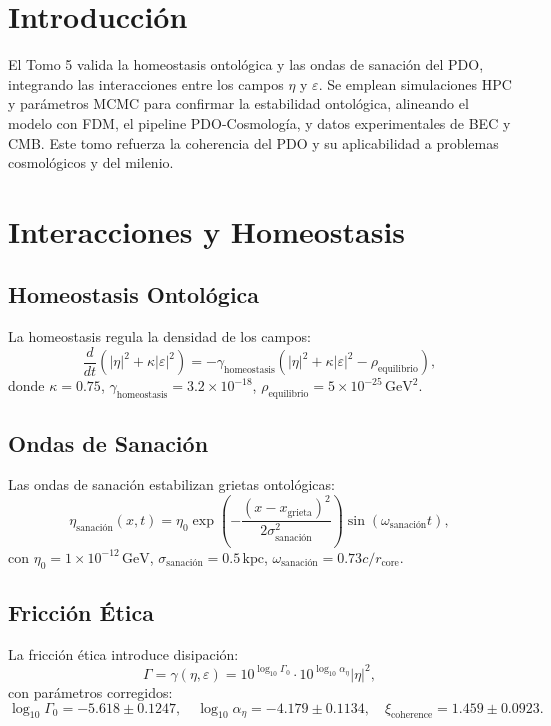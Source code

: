 \documentclass[a4paper,12pt]{article}
\newcommand{\eps}{\varepsilon}
\newcommand{\etaa}{\eta}
\newcommand{\gev}{\text{GeV}}
\newcommand{\rcore}{r_{\text{core}}}
\begin{document}
\tableofcontents
\newpage

\section{Introducción}
El Tomo 5 valida la homeostasis ontológica y las ondas de sanación del PDO, integrando las interacciones entre los campos \(\etaa\) y \(\eps\). Se emplean simulaciones HPC y parámetros MCMC para confirmar la estabilidad ontológica, alineando el modelo con FDM, el pipeline PDO-Cosmología, y datos experimentales de BEC y CMB. Este tomo refuerza la coherencia del PDO y su aplicabilidad a problemas cosmológicos y del milenio.

\section{Interacciones y Homeostasis}
\subsection{Homeostasis Ontológica}
La homeostasis regula la densidad de los campos:
\[
\frac{d}{dt}(|\etaa|^2 + \kappa |\eps|^2) = -\gamma_{\text{homeostasis}} (|\etaa|^2 + \kappa |\eps|^2 - \rho_{\text{equilibrio}}),
\]
donde \(\kappa = 0.75\), \(\gamma_{\text{homeostasis}} = 3.2 \times 10^{-18}\), \(\rho_{\text{equilibrio}} = 5 \times 10^{-25} \, \gev^2\).

\subsection{Ondas de Sanación}
Las ondas de sanación estabilizan grietas ontológicas:
\[
\etaa_{\text{sanación}}(x,t) = \eta_0 \exp\left(-\frac{(x-x_{\text{grieta}})^2}{2\sigma_{\text{sanación}}^2}\right) \sin(\omega_{\text{sanación}} t),
\]
con \(\eta_0 = 1 \times 10^{-12} \, \gev\), \(\sigma_{\text{sanación}} = 0.5 \, \text{kpc}\), \(\omega_{\text{sanación}} = 0.73c / \rcore\).

\subsection{Fricción Ética}
La fricción ética introduce disipación:
\[
\Gamma = \gamma(\etaa, \eps) = 10^{\log_{10} \Gamma_0} \cdot 10^{\log_{10} \alpha_\eta} |\etaa|^2,
\]
con parámetros corregidos:
\[
\log_{10} \Gamma_0 = -5.618 \pm 0.1247, \quad \log_{10} \alpha_\eta = -4.179 \pm 0.1134, \quad \xi_{\text{coherence}} = 1.459 \pm 0.0923.
\]
\end{document}
